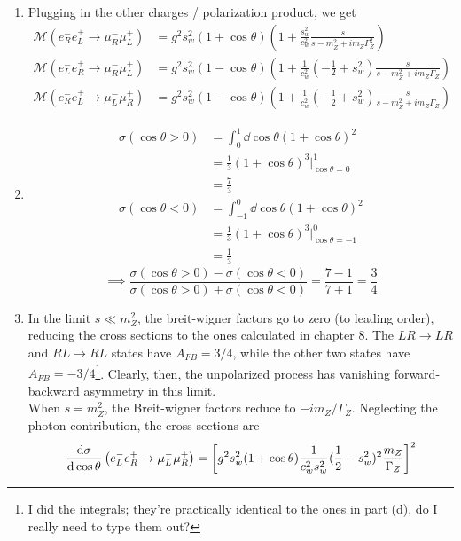 \documentclass[12pt]{article}
\begin{document}
\begin{enumerate}[label=(\alph*)]
    \item Plugging in the other charges / polarization product, we get
    \begin{align*}
        \mathcal{M}(e_R^-e_L^+\to\mu_R^-\mu_L^+) &= g^2s_w^2(1 + \cos\theta)\left(1 + \frac{s_w^2}{c_w^2}\frac{s}{s-m_Z^2+im_Z\Gamma_Z^2}\right)\\
        \mathcal{M}(e_L^-e_R^+\to\mu_R^-\mu_L^+) &= g^2s_w^2(1 - \cos\theta)\left(1 + \frac{1}{c_w^2}(-\frac{1}{2}+s_w^2)\frac{s}{s-m_Z^2+im_Z\Gamma_Z}\right)\\
        \mathcal{M}(e_R^-e_L^+\to\mu_L^-\mu_R^+) &= g^2s_w^2(1 - \cos\theta)\left(1 + \frac{1}{c_w^2}(-\frac{1}{2}+s_w^2)\frac{s}{s-m_Z^2+im_Z\Gamma_Z}\right)
    \end{align*}
    \item
    \begin{align*}
        \sigma(\cos\theta > 0) &= \int_0^1\dd \cos\theta \left(1 + \cos\theta\right)^2 \\
        &= \frac{1}{3}\left(1 + \cos\theta\right)^3\big|_{\cos\theta=0}^1 \\
        &= \frac{7}{3} \\
        \sigma(\cos\theta < 0) &= \int_{-1}^0\dd \cos\theta \left(1 + \cos\theta\right)^2 \\
        &= \frac{1}{3}\left(1 + \cos\theta\right)^3\big|_{\cos\theta=-1}^0 \\
        &= \frac{1}{3} 
    \end{align*}
    \[ \implies  \frac{\sigma(\cos\theta > 0) - \sigma(\cos\theta < 0)}{\sigma(\cos\theta > 0) + \sigma(\cos\theta < 0)} = \frac{7 - 1}{7+1} = \frac{3}{4} \]
    \item In the limit $s \ll m_Z^2$, the breit-wigner factors go to zero (to leading order), reducing the cross sections to the ones calculated in chapter 8. The $LR\to LR$ and $RL\to RL$ states have $A_{FB} = 3/4$, while the other two states have $A_{FB} = -3/4$\footnote{I did the integrals; they're practically identical to the ones in part (d), do I really need to type them out?}. Clearly, then, the unpolarized process has vanishing forward-backward asymmetry in this limit. \\
    When $s = m_Z^2$, the Breit-wigner factors reduce to $-im_Z/\Gamma_Z$. Neglecting the photon contribution, the cross sections are
    \begin{align*}
        \dv{\sigma}{\cos\theta}\left(e_L^-e_R^+\to\mu_L^-\mu_R^+\right) &= \left[g^2s_w^2(1 + \cos\theta)\frac{1}{c_w^2s_w^2}(\frac{1}{2}-s_w^2)^2\frac{m_Z}{\Gamma_Z} \right]^2 \\

\end{align*}
\end{enumerate}
\end{document}
